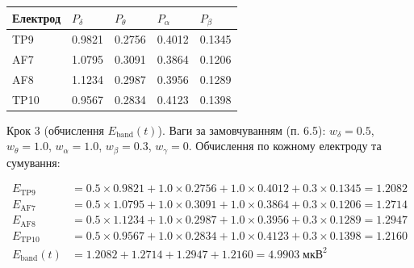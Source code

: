 \documentclass[12pt,a4paper]{article}
\begin{document}
{\def\LTcaptype{none} %

\begin{longtable}[]{@{}lllll@{}}

\toprule\noalign{}

Електрод & \(P_\delta\) & \(P_\theta\) & \(P_\alpha\) & \(P_\beta\) \\

\midrule\noalign{}

\endhead

\bottomrule\noalign{}

\endlastfoot

TP9 & 0.9821 & 0.2756 & 0.4012 & 0.1345 \\

AF7 & 1.0795 & 0.3091 & 0.3864 & 0.1206 \\

AF8 & 1.1234 & 0.2987 & 0.3956 & 0.1289 \\

TP10 & 0.9567 & 0.2834 & 0.4123 & 0.1398 \\

\end{longtable}

}



Крок 3 (обчислення \(E_{\text{band}}(t)\)). Ваги за замовчуванням (п. 6.5): \(w_\delta = 0.5\), \(w_\theta = 1.0\), \(w_\alpha = 1.0\), \(w_\beta = 0.3\), \(w_\gamma = 0\). Обчислення по кожному електроду та сумування:



\[\begin{aligned}

E_{\text{TP9}} &= 0.5 \times 0.9821 + 1.0 \times 0.2756 + 1.0 \times 0.4012 + 0.3 \times 0.1345 = 1.2082 \\

E_{\text{AF7}} &= 0.5 \times 1.0795 + 1.0 \times 0.3091 + 1.0 \times 0.3864 + 0.3 \times 0.1206 = 1.2714 \\

E_{\text{AF8}} &= 0.5 \times 1.1234 + 1.0 \times 0.2987 + 1.0 \times 0.3956 + 0.3 \times 0.1289 = 1.2947 \\

E_{\text{TP10}} &= 0.5 \times 0.9567 + 1.0 \times 0.2834 + 1.0 \times 0.4123 + 0.3 \times 0.1398 = 1.2160 \\[4pt]

E_{\text{band}}(t) &= 1.2082 + 1.2714 + 1.2947 + 1.2160 = 4.9903 \;\text{мкВ}^2

\end{aligned}\]
\end{document}
